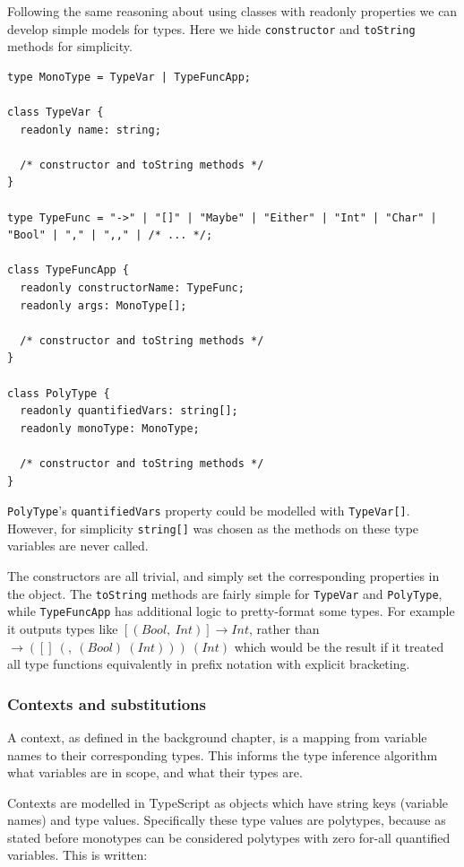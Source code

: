 \documentclass[a4paper,fleqn,oneside,12pt]{report}
\begin{document}
Following the same reasoning about using classes with readonly properties we can develop simple models for types. Here we hide \texttt{constructor} and \texttt{toString} methods for simplicity.

\begin{verbatim}
type MonoType = TypeVar | TypeFuncApp;

class TypeVar {
  readonly name: string;

  /* constructor and toString methods */
}

type TypeFunc = "->" | "[]" | "Maybe" | "Either" | "Int" | "Char" | "Bool" | "," | ",," | /* ... */;

class TypeFuncApp {
  readonly constructorName: TypeFunc;
  readonly args: MonoType[];

  /* constructor and toString methods */
}

class PolyType {
  readonly quantifiedVars: string[];
  readonly monoType: MonoType;

  /* constructor and toString methods */
}
\end{verbatim}
\texttt{PolyType}'s \texttt{quantifiedVars} property could be modelled with \texttt{TypeVar[]}. However, for simplicity \texttt{string[]} was chosen as the methods on these type variables are never called.

The constructors are all trivial, and simply set the corresponding properties in the object. The \texttt{toString} methods are fairly simple for \texttt{TypeVar} and \texttt{PolyType}, while \texttt{TypeFuncApp} has additional logic to pretty-format some types. For example it outputs types like $[(Bool,\ Int)] \rightarrow Int$, rather than $\rightarrow ([]\ (,\ (Bool)\ (Int)))\ (Int)$ which would be the result if it treated all type functions equivalently in prefix notation with explicit bracketing.

\subsubsection{Contexts and substitutions}\label{id:h.ux3btyb2wvh8}

A context, as defined in the background chapter, is a mapping from variable names to their corresponding types. This informs the type inference algorithm what variables are in scope, and what their types are.

Contexts are modelled in TypeScript as objects which have string keys (variable names) and type values. Specifically these type values are polytypes, because as stated before monotypes can be considered polytypes with zero for-all quantified variables. This is written:
\end{document}
